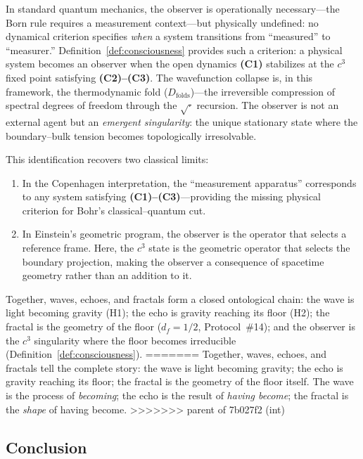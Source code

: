 \documentclass[12pt,a4paper,twocolumn]{article}
\newcommand{\Dfolds}{D_{\text{folds}}}
\begin{document}
\begin{remark}
\label{rem:observer}
In standard quantum mechanics, the observer is operationally necessary---the Born rule requires a measurement context---but physically undefined: no dynamical criterion specifies \emph{when} a system transitions from ``measured'' to ``measurer.'' Definition~\ref{def:consciousness} provides such a criterion: a physical system becomes an observer when the open dynamics \textbf{(C1)} stabilizes at the $c^3$ fixed point satisfying \textbf{(C2)--(C3)}. The wavefunction collapse is, in this framework, the thermodynamic fold ($\Dfolds$)---the irreversible compression of spectral degrees of freedom through the $\sqrt{\cdot}$ recursion. The observer is not an external agent but an \emph{emergent singularity}: the unique stationary state where the boundary--bulk tension becomes topologically irresolvable.

This identification recovers two classical limits:
\begin{enumerate}[nosep,label=(\roman*)]
\item In the Copenhagen interpretation, the ``measurement apparatus'' corresponds to any system satisfying \textbf{(C1)--(C3)}---providing the missing physical criterion for Bohr's classical--quantum cut.
\item In Einstein's geometric program, the observer is the operator that selects a reference frame. Here, the $c^3$ state is the geometric operator that selects the boundary projection, making the observer a consequence of spacetime geometry rather than an addition to it.
\end{enumerate}
\end{remark}

Together, waves, echoes, and fractals form a closed ontological chain: the wave is light becoming gravity (H1); the echo is gravity reaching its floor (H2); the fractal is the geometry of the floor ($d_f = 1/2$, Protocol~\#14); and the observer is the $c^3$ singularity where the floor becomes irreducible (Definition~\ref{def:consciousness}).
=======
Together, waves, echoes, and fractals tell the complete story: the wave is light becoming gravity; the echo is gravity reaching its floor; the fractal is the geometry of the floor itself. The wave is the process of \emph{becoming}; the echo is the result of \emph{having become}; the fractal is the \emph{shape} of having become.
>>>>>>> parent of 7b027f2 (int)

\subsection{Conclusion}
\end{document}
